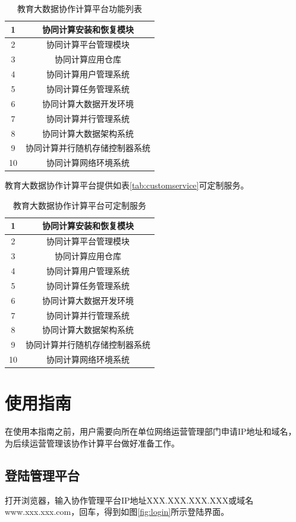 \documentclass[12pt]{ctexart}%
\begin{document}
\begin{table}[!htb]
\centering
\caption{教育大数据协作计算平台功能列表}  \label{tab:function}
\begin{tabular}{|c|c|} \hline
1 & 协同计算安装和恢复模块 \\ \hline
2 & 协同计算平台管理模块   \\ \hline
3 & 协同计算应用仓库     \\ \hline
4 & 协同计算用户管理系统  \\ \hline
5 & 协同计算任务管理系统  \\ \hline
6 & 协同计算大数据开发环境 \\ \hline
7 & 协同计算并行管理系统   \\ \hline
8 & 协同计算大数据架构系统  \\ \hline
9 & 协同计算并行随机存储控制器系统 \\ \hline
10 & 协同计算网络环境系统  \\ \hline
\end{tabular}
\end{table}
教育大数据协作计算平台提供如表\ref{tab:customservice}可定制服务。
\begin{table}[!htb]
\centering
\caption{教育大数据协作计算平台可定制服务}  \label{tab:function}
\begin{tabular}{|c|c|} \hline
1 & 协同计算安装和恢复模块 \\ \hline
2 & 协同计算平台管理模块   \\ \hline
3 & 协同计算应用仓库     \\ \hline
4 & 协同计算用户管理系统  \\ \hline
5 & 协同计算任务管理系统  \\ \hline
6 & 协同计算大数据开发环境 \\ \hline
7 & 协同计算并行管理系统   \\ \hline
8 & 协同计算大数据架构系统  \\ \hline
9 & 协同计算并行随机存储控制器系统 \\ \hline
10 & 协同计算网络环境系统  \\ \hline
\end{tabular}
\end{table}
\section {使用指南}
在使用本指南之前，用户需要向所在单位网络运营管理部门申请IP地址和域名，为后续运营管理该协作计算平台做好准备工作。
\subsection{登陆管理平台}
打开浏览器，输入协作管理平台IP地址XXX.XXX.XXX.XXX或域名www.xxx.xxx.com，回车，得到如图\ref{fig:login}所示登陆界面。
\end{document}

